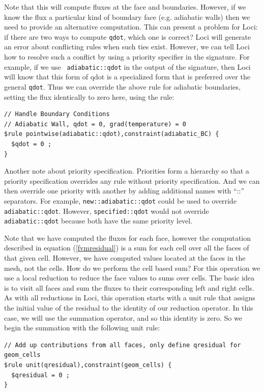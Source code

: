\documentclass[10pt,epsf,letterpaper,twoside]{book}
\begin{document}
Note that this will compute fluxes at the face and boundaries.
However, if we know the flux a particular kind of boundary face
(e.g. adiabatic walls) then we need to provide an alternative
computation.  This can present a problem for Loci: if there are two
ways to compute {\tt qdot}, which one is correct?  Loci will generate
an error about conflicting rules when such ties exist.  However, we
can tell Loci how to resolve such a conflict by using a priority
specifier in the signature.  For example, if we use {\tt
  adiabatic::qdot} in the output of the signature, then Loci will know
that this form of qdot is a specialized form that is preferred over the
general {\tt qdot}.  Thus we can override the above rule for adiabatic
boundaries, setting the flux identically to zero here, using the rule:
\begin{verbatim}
// Handle Boundary Conditions
// Adiabatic Wall, qdot = 0, grad(temperature) = 0
$rule pointwise(adiabatic::qdot),constraint(adiabatic_BC) {
  $qdot = 0 ;
}
\end{verbatim}
Another note about priority specification.  Priorities form a
hierarchy so that a priority specification overrides any rule without
priority specification.  And we can then override one priority with
another by adding additional names with ``::'' separators.  For
example, {\tt new::adiabatic::qdot} could be used to override
{\tt adiabatic::qdot}.  However, {\tt specified::qdot} would not override
{\tt adiabatic::qdot} because both have the same priority level.

Note that we have computed the fluxes for each face, however the
computation described in equation (\ref{fvmresidual}) is a sum for
each cell over all the faces of that given cell.  However, we have
computed values located at the faces in the mesh, not the cells.  How
do we perform the cell based sum?  For this operation we use a local
reduction to reduce the face values to sums over cells.  The basic
idea is to visit all faces and sum the fluxes to their corresponding
left and right cells.  As with all reductions in Loci, this operation
starts with a unit rule that assigns the initial value of the residual
to the identity of our reduction operator.  In this case, we will use
the summation operator, and so this identity is zero.  So we begin the
summation with the following unit rule:
\begin{verbatim}
// Add up contributions from all faces, only define qresidual for geom_cells
$rule unit(qresidual),constraint(geom_cells) {
  $qresidual = 0 ;
}
\end{verbatim}
\end{document}
